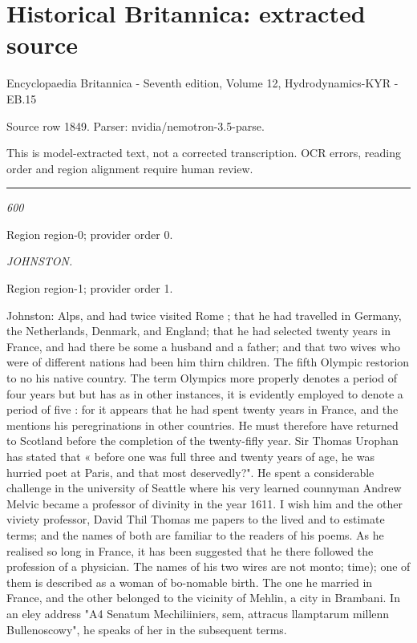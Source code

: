 \documentclass[11pt]{article}
\begin{document}
\section*{Historical Britannica: extracted source}
Encyclopaedia Britannica - Seventh edition, Volume 12, Hydrodynamics-KYR - EB.15\par
{\small Source row 1849. Parser: nvidia/nemotron-3.5-parse.\par}
{\small This is model-extracted text, not a corrected transcription. OCR errors, reading order and region alignment require human review.\par}
\hrule\medskip
{\small\itshape 600\par}

{\scriptsize\color{gray} Region region-0; provider order 0.\par}
\medskip

{\small\itshape JOHNSTON.\par}

{\scriptsize\color{gray} Region region-1; provider order 1.\par}
\medskip

Johnston: Alps, and had twice visited Rome ; that he had travelled in Germany, the Netherlands, Denmark, and England; that he had selected twenty years in France, and had there be some a husband and a father; and that two wives who were of different nations had been him thirn children. The fifth Olympic restorion to no his native country. The term Olympics more properly denotes a period of four years but but has as in other instances, it is evidently employed to denote a period of five : for it appears that he had spent twenty years in France, and the mentions his peregrinations in other countries. He must therefore have returned to Scotland before the completion of the twenty-fifly year. Sir Thomas Urophan has stated that « before one was full three and twenty years of age, he was hurried poet at Paris, and that most deservedly?". He spent a considerable challenge in the university of Seattle where his very learned counnyman Andrew Melvic became a professor of divinity in the year 1611. I wish him and the other viviety professor, David Thil Thomas me papers to the lived and to estimate terms; and the names of both are familiar to the readers of his poems. As he realised so long in France, it has been suggested that he there followed the profession of a physician. The names of his two wires are not monto; time); one of them is described as a woman of bo-nomable birth. The one he married in France, and the other belonged to the vicinity of Mehlin, a city in Brambani. In an eley address "A4 Senatum Mechiliiniers, sem, attracus llamptarum millenn Bullenoscowy", he speaks of her in the subsequent terms.
\par
\end{document}
